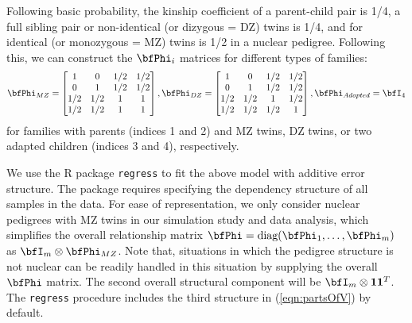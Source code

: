 Following basic probability, the kinship coefficient of a parent-child pair is 1/4, a full sibling pair or non-identical (or dizygous = DZ) twins is 1/4, and for identical (or monozygous = MZ) twins is 1/2 in a nuclear pedigree. Following this, we can construct the $\bfPhi_i$ matrices for different types of families:
%
\begin{align*}
\bfPhi_{MZ} = \begin{bmatrix}
1 & 0 & 1/2 & 1/2 \\
0 & 1 & 1/2 & 1/2 \\
1/2 & 1/2 & 1 & 1\\
1/2 & 1/2 & 1 & 1
\end{bmatrix},
\bfPhi_{DZ} = \begin{bmatrix}
1 & 0 & 1/2 & 1/2 \\
0 & 1 & 1/2 & 1/2 \\
1/2 & 1/2 & 1 & 1/2\\
1/2 & 1/2 & 1/2 & 1
\end{bmatrix},
\bfPhi_{Adopted} = \bfI_4
\end{align*}
%
for families with parents (indices 1 and 2) and MZ twins, DZ twins, or two adapted children (indices 3 and 4), respectively.

We use the R package \texttt{regress} to fit the above model with additive error structure. The package requires specifying the dependency structure of all samples in the data. For ease of representation, we only consider nuclear pedigrees with MZ twins in our simulation study and data analysis, which simplifies the overall relationship matrix $\bfPhi = \text{diag} ( \bfPhi_1, \ldots, \bfPhi_m)$ as $\bfI_m \otimes \bfPhi_{MZ}$. Note that, situations in which the pedigree structure is not nuclear can be readily handled in this situation by supplying the overall $\bfPhi$ matrix. The second overall structural component will be  $\bfI_m \otimes {\bf 1} {\bf 1}^T$. The \texttt{regress} procedure includes the third structure in (\ref{eqn:partsOfV}) by default.